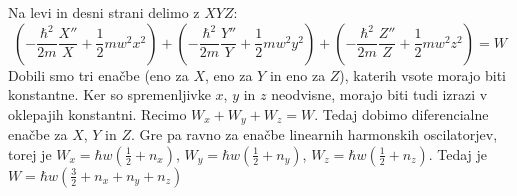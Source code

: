 \documentclass[a4paper]{article}
\begin{document}
Na levi in desni strani delimo z $XYZ$:
$$\left(-\frac{\hbar^2}{2m}\frac{X''}{X} + \frac{1}{2}mw^2x^2\right) + \left(-\frac{\hbar^2}{2m}\frac{Y''}{Y} + \frac{1}{2}mw^2y^2\right) + \left(-\frac{\hbar^2}{2m}\frac{Z''}{Z} + \frac{1}{2}mw^2z^2\right) = W$$
Dobili smo tri enačbe (eno za $X$, eno za $Y$ in eno za $Z$), katerih vsote morajo biti konstantne. Ker so spremenljivke $x$, $y$ in $z$ neodvisne, morajo biti tudi izrazi v oklepajih konstantni.
Recimo $W_x + W_y + W_z = W$. Tedaj dobimo diferencialne enačbe za $X$, $Y$ in $Z$. Gre pa ravno za enačbe linearnih harmonskih oscilatorjev, torej je
$\displaystyle{W_x = \hbar w(\frac{1}{2} + n_x)}$, $\displaystyle{W_y = \hbar w(\frac{1}{2} + n_y)}$, $\displaystyle{W_z = \hbar w(\frac{1}{2} + n_z)}$.
Tedaj je $\displaystyle{W = \hbar w \left(\frac{3}{2} + n_x + n_y + n_z\right)}$
\end{document}
